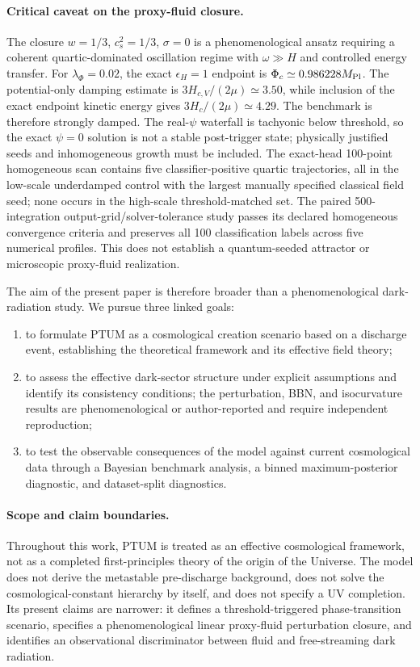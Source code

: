 \documentclass[epj]{svjour}
\begin{document}
\paragraph{Critical caveat on the proxy-fluid closure.}
The closure $w=1/3$, $c_s^2=1/3$, $\sigma=0$ is a
phenomenological ansatz requiring a coherent quartic-dominated
oscillation regime with $\omega\gg H$ and controlled energy transfer.
For $\lambda_\Phi=0.02$, the exact $\epsilon_H=1$ endpoint is
$\Phi_c\simeq0.986228M_{\rm Pl}$. The potential-only damping estimate
is $3H_{c,V}/(2\mu)\simeq3.50$, while inclusion of the exact endpoint
kinetic energy gives $3H_c/(2\mu)\simeq4.29$. The benchmark is
therefore strongly damped. The real-$\psi$ waterfall is tachyonic
below threshold, so the exact $\psi=0$ solution is not a stable
post-trigger state; physically justified seeds and inhomogeneous
growth must be included. The exact-head 100-point homogeneous scan contains five
classifier-positive quartic trajectories, all in the low-scale
underdamped control with the largest manually specified classical
field seed; none occurs in the high-scale threshold-matched set.
The paired 500-integration output-grid/solver-tolerance study passes
its declared homogeneous convergence criteria and preserves all
100 classification labels across five numerical profiles. This does
not establish a quantum-seeded attractor or microscopic proxy-fluid
realization.

The aim of the present paper is therefore broader than a
phenomenological dark-radiation study. We pursue three linked goals:

\begin{enumerate}[label=(\roman*)]
\item to formulate PTUM as a cosmological creation scenario based on
      a discharge event, establishing the theoretical framework and
      its effective field theory;
\item to assess the effective dark-sector structure under explicit
      assumptions and identify its consistency conditions; the
      perturbation, BBN, and isocurvature results are phenomenological
      or author-reported and require independent reproduction;
\item to test the observable consequences of the model against
      current cosmological data through a Bayesian benchmark analysis,
      a binned maximum-posterior diagnostic, and dataset-split
      diagnostics.
\end{enumerate}

\paragraph{Scope and claim boundaries.}
Throughout this work, PTUM is treated as an effective cosmological framework,
not as a completed first-principles theory of the origin of the Universe. The
model does not derive the metastable pre-discharge background, does not solve
the cosmological-constant hierarchy by itself, and does not specify a UV
completion. Its present claims are narrower: it defines a threshold-triggered
phase-transition scenario, specifies a phenomenological linear proxy-fluid perturbation closure,
and identifies an observational discriminator between fluid and free-streaming
dark radiation.
\end{document}
